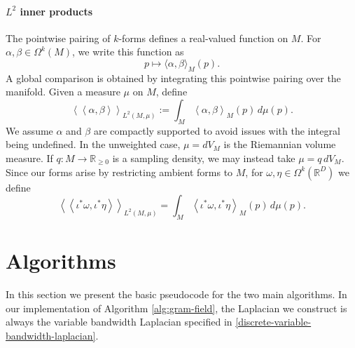 \documentclass{article}
\newcommand{\R}{\mathbb{R}}
\theoremstyle{remark}
\theoremstyle{plain}
\begin{document}
\paragraph{$L^2$ inner products}
The pointwise pairing of $k$-forms defines a real-valued function on $M$.
For $\alpha,\beta \in \Omega^k(M)$, we write this function as
\begin{equation}
p \mapsto \langle \alpha,\beta\rangle_{M}(p).
\end{equation}
A global comparison is obtained by integrating this pointwise pairing over the manifold. Given a measure $\mu$ on $M$, define
\begin{equation}
\left\langle\!\left\langle
\alpha,\beta
\right\rangle\!\right\rangle_{L^2(M,\mu)}
:=
\int_M
\left\langle
\alpha,\beta
\right\rangle_{M}(p)
\,d\mu(p).
\end{equation}
We assume $\alpha$ and $\beta$ are compactly supported to avoid issues with the integral being undefined. In the unweighted case, $\mu=dV_M$ is the Riemannian volume measure. If $q:M \to \R_{\geq 0}$ is a sampling density, we may instead take
$\mu=q\,dV_M$. Since our forms arise by restricting ambient forms to $M$, for
$\omega,\eta\in\Omega^k(\mathbb{R}^D)$ we define
\begin{equation}
\left\langle\!\left\langle
\iota^*\omega,\iota^*\eta
\right\rangle\!\right\rangle_{L^2(M,\mu)}
=
\int_M
\left\langle
\iota^*\omega,\iota^*\eta
\right\rangle_{M}(p)
\,d\mu(p).
\end{equation}





\newpage
\section{Algorithms}
In this section we present the basic pseudocode for the two main algorithms. In our implementation of Algorithm \ref{alg:gram-field}, the Laplacian we construct is always the variable bandwidth Laplacian specified in \ref{discrete-variable-bandwidth-laplacian}.
\end{document}
